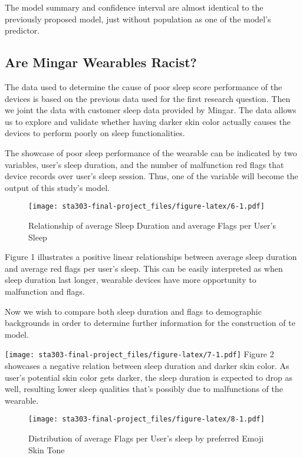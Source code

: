 \documentclass[
          english,
          paper=a4,
              ,captions=tableheading
  ]{scrartcl}
\begin{document}
The model summary and confidence interval are almost identical to the
previously proposed model, just without population as one of the model's
predictor.

\hypertarget{are-mingar-wearables-racist}{%
\subsection{Are Mingar Wearables
Racist?}\label{are-mingar-wearables-racist}}

The data used to determine the cause of poor sleep score performance of
the devices is based on the previous data used for the first research
question. Then we joint the data with customer sleep data provided by
Mingar. The data allows us to explore and validate whether having darker
skin color actually causes the devices to perform poorly on sleep
functionalities.

The showcase of poor sleep performance of the wearable can be indicated
by two variables, user's sleep duration, and the number of malfunction
red flags that device records over user's sleep session. Thus, one of
the variable will become the output of this study's model.

\begin{figure}
\centering
\texttt{[image: sta303-final-project\_files/figure-latex/6-1.pdf]}
\caption{Relationship of average Sleep Duration and average Flags per
User's Sleep}
\end{figure}

Figure 1 illustrates a positive linear relationships between average
sleep duration and average red flags per user's sleep. This can be
easily interpreted as when sleep duration last longer, wearable devices
have more opportunity to malfunction and flags.

Now we wish to compare both sleep duration and flags to demographic
backgrounds in order to determine further information for the
construction of te model.

\texttt{[image: sta303-final-project\_files/figure-latex/7-1.pdf]} Figure
2 showcases a negative relation between sleep duration and darker skin
color. As user's potential skin color gets darker, the sleep duration is
expected to drop as well, resulting lower sleep qualities that's
possibly due to malfunctions of the wearable.

\begin{figure}
\centering
\texttt{[image: sta303-final-project\_files/figure-latex/8-1.pdf]}
\caption{Distribution of average Flags per User's sleep by preferred
Emoji Skin Tone}
\end{figure}
\end{document}
